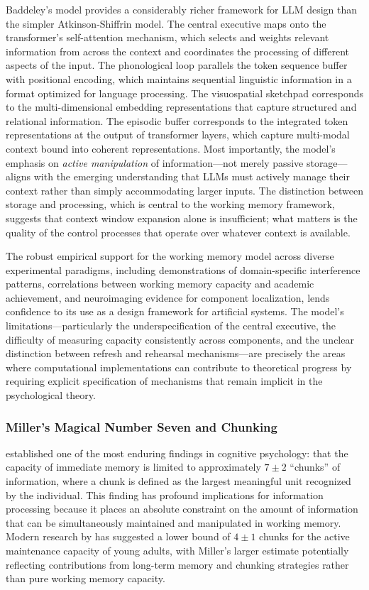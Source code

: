 Baddeley's model provides a considerably richer framework for LLM design than the simpler Atkinson-Shiffrin model. The central executive maps onto the transformer's self-attention mechanism, which selects and weights relevant information from across the context and coordinates the processing of different aspects of the input. The phonological loop parallels the token sequence buffer with positional encoding, which maintains sequential linguistic information in a format optimized for language processing. The visuospatial sketchpad corresponds to the multi-dimensional embedding representations that capture structured and relational information. The episodic buffer corresponds to the integrated token representations at the output of transformer layers, which capture multi-modal context bound into coherent representations. Most importantly, the model's emphasis on \emph{active manipulation} of information---not merely passive storage---aligns with the emerging understanding that LLMs must actively manage their context rather than simply accommodating larger inputs. The distinction between storage and processing, which is central to the working memory framework, suggests that context window expansion alone is insufficient; what matters is the quality of the control processes that operate over whatever context is available.

The robust empirical support for the working memory model across diverse experimental paradigms, including demonstrations of domain-specific interference patterns, correlations between working memory capacity and academic achievement, and neuroimaging evidence for component localization, lends confidence to its use as a design framework for artificial systems. The model's limitations---particularly the underspecification of the central executive, the difficulty of measuring capacity consistently across components, and the unclear distinction between refresh and rehearsal mechanisms---are precisely the areas where computational implementations can contribute to theoretical progress by requiring explicit specification of mechanisms that remain implicit in the psychological theory.

\subsubsection{Miller's Magical Number Seven and Chunking}

\citet{miller1956magical} established one of the most enduring findings in cognitive psychology: that the capacity of immediate memory is limited to approximately $7 \pm 2$ ``chunks'' of information, where a chunk is defined as the largest meaningful unit recognized by the individual. This finding has profound implications for information processing because it places an absolute constraint on the amount of information that can be simultaneously maintained and manipulated in working memory. Modern research by \citet{cowan2001magical} has suggested a lower bound of $4 \pm 1$ chunks for the active maintenance capacity of young adults, with Miller's larger estimate potentially reflecting contributions from long-term memory and chunking strategies rather than pure working memory capacity.

